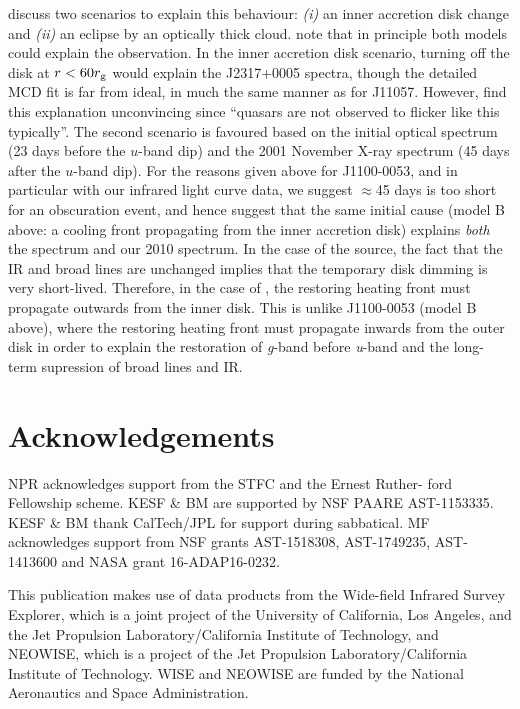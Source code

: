 \documentclass[11pt,a4paper]{article}
\begin{document}
\citet{Guo2016} discuss two scenarios to explain this behaviour: {\it
(i)} an inner accretion disk change and {\it (ii)} an eclipse by an
optically thick cloud. \citet{Guo2016} note that in principle both
models could explain the observation. In the inner accretion disk
scenario, turning off the disk at $r < 60 r_{\rm g}$ would explain the
J2317+0005 spectra, though the detailed MCD fit is far from ideal, in
much the same manner as for J11057. However, \citet{Guo2016} find this
explanation unconvincing since ``quasars are not observed to flicker
like this typically''.  The second scenario is favoured based on the
initial optical spectrum (23 days before the $u$-band dip) and the
2001 November X-ray spectrum (45 days after the $u$-band dip).  For
the reasons given above for J1100-0053, and in particular with our
infrared light curve data, we suggest $\approx$45 days is too short
for an obscuration event, and hence suggest that the same initial
cause (model B above: a cooling front propagating from the inner
accretion disk) explains \emph{both} the \citet{Guo2016} spectrum and
our 2010 spectrum. In the case of the \citet{Guo2016} source, the fact
that the IR and broad lines are unchanged implies that the temporary
disk dimming is very short-lived. Therefore, in the case of
\citet{Guo2016}, the restoring heating front must propagate outwards
from the inner disk. This is unlike J1100-0053 (model B above), where the
restoring heating front must propagate inwards from the outer disk in
order to explain the restoration of {\it g}-band before {\it u}-band
and the long-term supression of broad lines and IR.


\section*{Acknowledgements}
NPR acknowledges support from the STFC and the Ernest Ruther- ford
Fellowship scheme.  KESF \& BM are supported by NSF PAARE
AST-1153335. KESF \& BM thank CalTech/JPL for support during
sabbatical.  MF acknowledges support from NSF grants AST-1518308,
AST-1749235, AST-1413600 and NASA grant 16-ADAP16-0232.

This publication makes use of data products from the Wide-field
Infrared Survey Explorer, which is a joint project of the University
of California, Los Angeles, and the Jet Propulsion
Laboratory/California Institute of Technology, and NEOWISE, which is a
project of the Jet Propulsion Laboratory/California Institute of
Technology. WISE and NEOWISE are funded by the National Aeronautics
and Space Administration.
\end{document}
